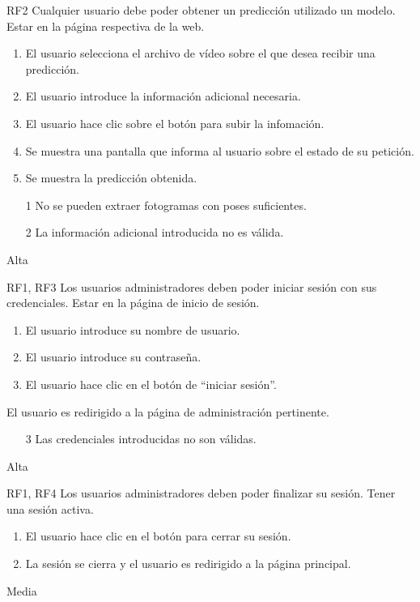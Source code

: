 
{RF2}
{Cualquier usuario debe poder obtener un predicción utilizado un modelo.}
{Estar en la página respectiva de la web.}
{
    \begin{enumerate}
        \def\labelenumi{\arabic{enumi}.}
        \tightlist
        \item El usuario selecciona el archivo de vídeo sobre el que desea
              recibir una predicción.
        \item El usuario introduce la información adicional necesaria.
        \item El usuario hace clic sobre el botón para subir la infomación.
        \item Se muestra una pantalla que informa al usuario sobre el estado de
              su petición.
        \item Se muestra la predicción obtenida.
    \end{enumerate}
}
{}
{
    \begin{itemize}
        \item [1] No se pueden extraer fotogramas con poses suficientes.
        \item [2] La información adicional introducida no es válida.
    \end{itemize}
}
{Alta}

{RF1, RF3}
{Los usuarios administradores deben poder iniciar sesión con sus credenciales.}
{Estar en la página de inicio de sesión.}
{
    \begin{enumerate}
        \def\labelenumi{\arabic{enumi}.}
        \tightlist
        \item El usuario introduce su nombre de usuario.
        \item El usuario introduce su contraseña.
        \item El usuario hace clic en el botón de ``iniciar sesión''.
    \end{enumerate}
}
{El usuario es redirigido a la página de administración pertinente.}
{
    \begin{itemize}
        \item [3] Las credenciales introducidas no son válidas.
    \end{itemize}
}
{Alta}

{RF1, RF4}
{Los usuarios administradores deben poder finalizar su sesión.}
{Tener una sesión activa.}
{
    \begin{enumerate}
        \def\labelenumi{\arabic{enumi}.}
        \tightlist
        \item El usuario hace clic en el botón para cerrar su sesión.
        \item La sesión se cierra y el usuario es redirigido a la página principal.
    \end{enumerate}
}
{}
{}
{Media}

